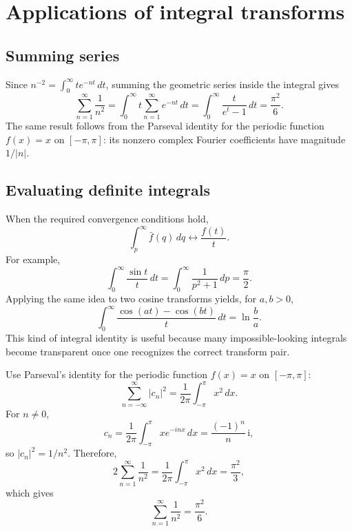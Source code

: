 \section{Applications of integral transforms}

\subsection{Summing series}

Since $n^{-2}=\int_0^\infty te^{-nt}\,dt$, summing the geometric series inside the integral gives
\begin{equation}
\sum_{n=1}^{\infty}\frac{1}{n^2}
=\int_0^\infty t\sum_{n=1}^{\infty}e^{-nt}\,dt
=\int_0^\infty\frac{t}{e^t-1}\,dt
=\frac{\pi^2}{6}.
\end{equation}
The same result follows from the Parseval identity for the periodic function $f(x)=x$ on $[-\pi,\pi]$: its nonzero complex Fourier coefficients have magnitude $1/|n|$.

\subsection{Evaluating definite integrals}

When the required convergence conditions hold,
\begin{equation}
\int_p^\infty\bar f(q)\,dq\longleftrightarrow\frac{f(t)}{t}.
\end{equation}
For example,
\begin{equation}
\int_0^\infty\frac{\sin t}{t}\,dt
=\int_0^\infty\frac{1}{p^2+1}\,dp
=\frac{\pi}{2}.
\end{equation}
Applying the same idea to two cosine transforms yields, for $a,b>0$,
\begin{equation}
\int_0^\infty\frac{\cos(at)-\cos(bt)}{t}\,dt=\ln\frac{b}{a}.
\end{equation}
This kind of integral identity is useful because many impossible-looking integrals become transparent once one recognizes the correct transform pair.

\begin{note}
Use Parseval's identity for the periodic function $f(x)=x$ on $[-\pi,\pi]$:
\begin{equation}
\sum_{n=-\infty}^{\infty}|c_n|^2
=\frac{1}{2\pi}\int_{-\pi}^{\pi}x^2\,dx.
\end{equation}
For $n\neq0$,
\begin{equation}
 c_n=\frac{1}{2\pi}\int_{-\pi}^{\pi}xe^{-inx}\,dx=\frac{(-1)^n}{n}\,\mathrm{i},
\end{equation}
so $|c_n|^2=1/n^2$. Therefore,
\begin{equation}
2\sum_{n=1}^{\infty}\frac{1}{n^2}
=\frac{1}{2\pi}\int_{-\pi}^{\pi}x^2\,dx
=\frac{\pi^2}{3},
\end{equation}
which gives
\begin{equation}
\sum_{n=1}^{\infty}\frac{1}{n^2}=\frac{\pi^2}{6}.
\end{equation}
\end{note}

